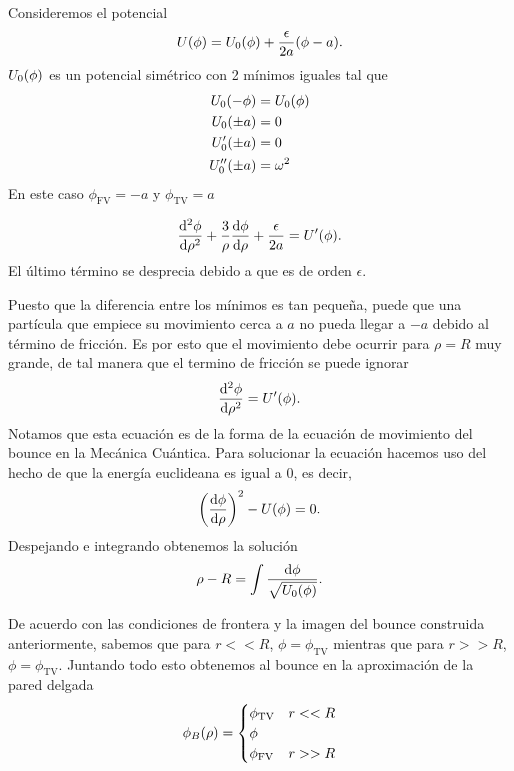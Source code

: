 \documentclass[11pt, a4paper]{article}
\numberwithin{equation}{section}
\theoremstyle{definition}
\begin{document}
Consideremos el potencial
\begin{equation}
	U\qty(\phi) = U_0\qty(\phi) + \frac{\epsilon}{2a}\qty(\phi - a).
\end{equation} 
$ U_0\qty(\phi)$ es un potencial simétrico con 2 mínimos iguales tal que
\begin{align}
	U_0\qty(-\phi) &= U_0\qty(\phi) \\
	U_0 \qty(\pm a) &= 0 \\
	U'_0 \qty(\pm a) &= 0 \\
	U''_0 \qty(\pm a) &= \omega^2 
\end{align}
En este caso $\phi_{\text{FV}} = -a$ y $\phi_{\text{TV}} = a$

\begin{equation} \label{eq:eom_rho_tw1}
\dv[2]{\phi}{\rho} + \frac{3}{\rho}\dv{\phi}{\rho} + \frac{\epsilon}{2a} = U'\qty(\phi).
\end{equation}
El último término se desprecia debido a que es de orden $\epsilon$. 

Puesto que la diferencia entre los mínimos es tan pequeña, puede que
una partícula que empiece su movimiento cerca a $a$ no pueda llegar a $-a$ debido al término de fricción. Es por esto que el movimiento debe ocurrir para $\rho = R$ muy grande, de tal manera que el termino de fricción se puede ignorar
\begin{equation} \label{eq:eom_rho_tw2}
\dv[2]{\phi}{\rho} = U'\qty(\phi).
\end{equation}
Notamos que esta ecuación es de la forma de la ecuación de movimiento del bounce en la Mecánica Cuántica. Para solucionar la ecuación hacemos uso del hecho de que la energía euclideana es igual a 0, es decir, 
\begin{equation}
	\qty(\dv{\phi}{\rho})^2 - U\qty(\phi) = 0.
\end{equation}
Despejando e integrando obtenemos la solución
\begin{equation}
	\rho - R = \int \frac{\dd{\phi}}{\sqrt{U_0\qty(\phi)}}.
\end{equation}

De acuerdo con las condiciones de frontera y la imagen del bounce construida anteriormente, sabemos que para $r << R $,
$\phi = \phi_{\text{TV}}$ mientras que para $r >> R$,
$\phi = \phi_{\text{TV}}$. Juntando todo esto obtenemos al bounce en la aproximación de la pared delgada
\begin{equation}
	\phi_B \qty(\rho) = \begin{cases}
	\phi_{\text{TV}} & r << R \\
	\phi \\
	\phi_{\text{FV}} & r >> R
	\end{cases}
\end{equation}
\end{document}
